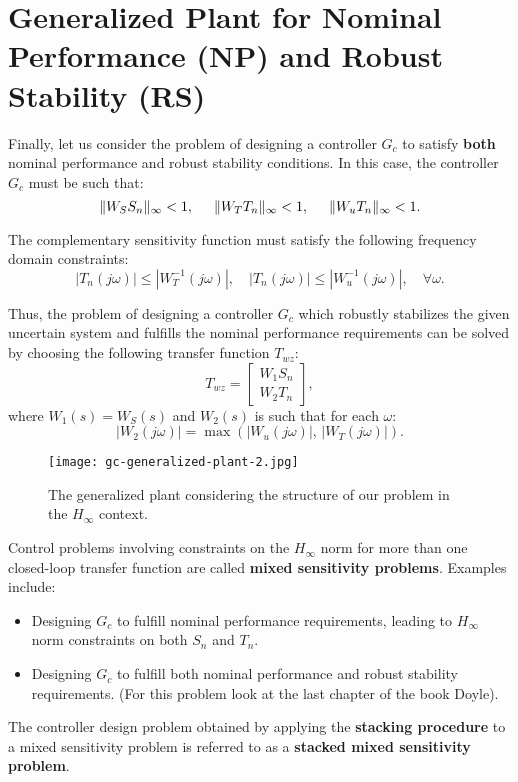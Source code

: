 \section{Generalized Plant for Nominal Performance (NP) and Robust Stability (RS)}
Finally, let us consider the problem of designing a controller $G_c$ to satisfy \textbf{both} nominal performance and robust stability conditions. In this case, the controller $G_c$ must be such that:
\[
\|W_SS_n\|_\infty < 1, \hspace{0.5cm} \|W_TT_n\|_\infty < 1, \hspace{0.5cm} \|W_uT_n\|_\infty < 1.
\]

The complementary sensitivity function must satisfy the following frequency domain constraints:
\[
|T_n(j\omega)|\leq|W_T^{-1}(j\omega)|,\quad |T_n(j\omega)|\leq|W_u^{-1}(j\omega)|, \quad \forall \omega.
\]

Thus, the problem of designing a controller $G_c$ which robustly stabilizes the given uncertain system and fulfills the nominal performance requirements can be solved by choosing the following transfer function $T_{wz}$:
\[
T_{wz} =
\begin{bmatrix}
W_1S_n \\
W_2T_n
\end{bmatrix},
\]
where \( W_1(s) = W_S(s) \) and \( W_2(s) \) is such that for each \(\omega\):
\[
|W_2(j\omega)| = \max(|W_u(j\omega)|,\,|W_T(j\omega)|).
\]

\begin{figure}[H]
    \centering
    \texttt{[image: gc-generalized-plant-2.jpg]}
    \caption{The generalized plant considering the structure of our problem in the $H_\infty$ context.}
\end{figure}

Control problems involving constraints on the $H_\infty$ norm for more than one closed-loop transfer function are called \textbf{mixed sensitivity problems}. Examples include:
\begin{itemize}
    \item Designing $G_c$ to fulfill nominal performance requirements, leading to $H_\infty$ norm constraints on both $S_n$ and $T_n$.
    \item Designing $G_c$ to fulfill both nominal performance and robust stability requirements. (For this problem look at the last chapter of the book Doyle).
\end{itemize}

The controller design problem obtained by applying the \textbf{stacking procedure} to a mixed sensitivity problem is referred to as a \textbf{stacked mixed sensitivity problem}.

